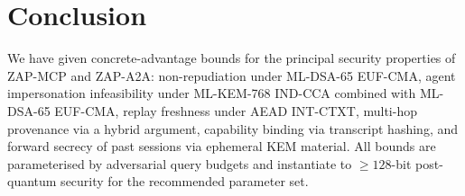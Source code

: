 \documentclass[11pt,a4paper]{article}
\theoremstyle{definition}
\theoremstyle{remark}
\newcommand{\zapmcp}{\textsf{ZAP-MCP}\xspace}
\newcommand{\zapaa}{\textsf{ZAP-A2A}\xspace}
\begin{document}
\section{Conclusion}

We have given concrete-advantage bounds for the principal security
properties of \zapmcp{} and \zapaa{}: non-repudiation under
ML-DSA-65 EUF-CMA, agent impersonation infeasibility under
ML-KEM-768 IND-CCA combined with ML-DSA-65 EUF-CMA, replay freshness
under AEAD INT-CTXT, multi-hop provenance via a hybrid argument,
capability binding via transcript hashing, and forward secrecy of
past sessions via ephemeral KEM material. All bounds are
parameterised by adversarial query budgets and instantiate to
$\geq 128$-bit post-quantum security for the recommended
parameter set.
\end{document}
